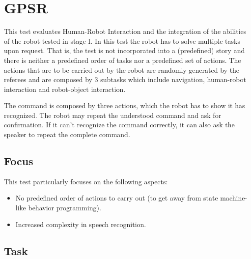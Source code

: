 \section{GPSR}

This test evaluates Human-Robot Interaction and the integration of the abilities of the robot tested in stage I. In this test the robot has to solve multiple tasks upon request. That is, the test is not incorporated into a (predefined) story and there is neither a predefined order of tasks nor a predefined set of actions. The actions that are to be carried out by the robot are randomly generated by the referees and are composed by 3 subtasks which include navigation, human-robot interaction and robot-object interaction.

The command is composed by three actions, which the robot has to
show it has recognized. The robot may repeat the understood command and ask for confirmation. If it can't recognize the command correctly, it can also ask the speaker to repeat the complete command.

\subsection{Focus}
This test particularly focuses on the following aspects:
\begin{itemize}
\item No predefined order of actions to carry out (to get away from state machine-like behavior programming).
\item Increased complexity in speech recognition.
\end{itemize}

\subsection{Task}

